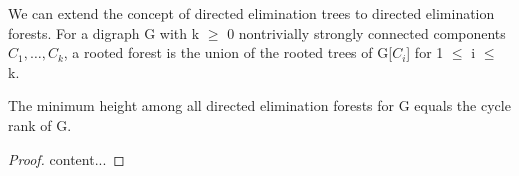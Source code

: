 We can extend the concept of directed elimination trees to directed elimination forests. For a digraph G with k $\geq$ 0 nontrivially strongly connected components $C_1, \ldots, C_k$, a rooted forest is the union of the rooted trees of G[$C_i$] for 1 $\leq$ i $\leq$ k.

\begin{lemma}
The minimum height among all directed elimination forests for G equals the cycle rank of G.
\end{lemma}
\begin{proof}
content...
\end{proof}